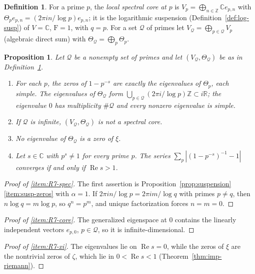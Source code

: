 \documentclass[11pt]{amsart}
\theoremstyle{plain}
\newtheorem{proposition}[theorem]{Proposition}
\theoremstyle{definition}
\newtheorem{definition}[theorem]{Definition}
\theoremstyle{remark}
\numberwithin{equation}{section}
\newcommand{\C}{\mathbb{C}}
\newcommand{\R}{\mathbb{R}}
\newcommand{\Z}{\mathbb{Z}}
\DeclareMathOperator{\Rea}{Re}
\renewcommand{\Re}{\Rea}
\begin{document}
\begin{definition}\label{def:R7-local}
For a prime $p$, the \emph{local spectral core at $p$} is
$V_p=\bigoplus_{n\in\Z}\C e_{p,n}$ with $\Theta_pe_{p,n}=(2\pi in/\log
p)e_{p,n}$; it is the logarithmic suspension
(Definition~\ref{def:log-susp}) of $V=\C$, $\mathrm F=1$, with $q=p$.
For a set $\mathcal Q$ of primes let
$V_{\mathcal Q}=\bigoplus_{p\in\mathcal Q}V_p$ (algebraic direct sum)
with $\Theta_{\mathcal Q}=\bigoplus_p\Theta_p$.
\end{definition}

\begin{proposition}\label{prop:R7}
Let $\mathcal Q$ be a nonempty set of primes and let
$(V_{\mathcal Q},\Theta_{\mathcal Q})$ be as in
Definition~\ref{def:R7-local}.
\begin{enumerate}[label=(\roman*)]
\item\label{item:R7-spec} For each $p$, the zeros of $1-p^{-s}$ are
  exactly the eigenvalues of $\Theta_p$, each simple. The eigenvalues of
  $\Theta_{\mathcal Q}$ form $\bigcup_{p\in\mathcal Q}(2\pi i/\log p)\Z
  \subset i\R$; the eigenvalue $0$ has multiplicity $\#\mathcal Q$ and
  every nonzero eigenvalue is simple.
\item\label{item:R7-core} If $\mathcal Q$ is infinite,
  $(V_{\mathcal Q},\Theta_{\mathcal Q})$ is not a spectral core.
\item\label{item:R7-xi} No eigenvalue of $\Theta_{\mathcal Q}$ is a zero
  of $\xi$.
\item\label{item:R7-euler} Let $s\in\C$ with $p^s\ne1$ for every prime
  $p$. The series $\sum_p|(1-p^{-s})^{-1}-1|$ converges if and only if
  $\Re s>1$.
\end{enumerate}
\end{proposition}

\begin{proof}[Proof of \ref{item:R7-spec}]
The first assertion is
Proposition~\ref{prop:suspension}\ref{item:susp-zeros} with $\alpha=1$.
If $2\pi in/\log p=2\pi im/\log q$ with primes $p\ne q$, then $n\log
q=m\log p$, so $q^n=p^m$, and unique factorization forces $n=m=0$.
\end{proof}

\begin{proof}[Proof of \ref{item:R7-core}]
The generalized eigenspace at $0$ contains the linearly independent
vectors $e_{p,0}$, $p\in\mathcal Q$, so it is infinite-dimensional.
\end{proof}

\begin{proof}[Proof of \ref{item:R7-xi}]
The eigenvalues lie on $\Re s=0$, while the zeros of $\xi$ are the
nontrivial zeros of $\zeta$, which lie in $0<\Re s<1$
(Theorem~\ref{thm:imp-riemann}).
\end{proof}
\end{document}
